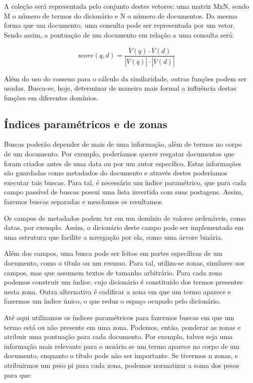 A coleção será representada pelo conjunto destes vetores: uma matriz MxN, sendo M o número de termos do dicionário e N o número de documentos. Da mesma forma que um documento, uma consulta pode ser representada por um vetor. Sendo assim, a pontuação de um documento em relação a uma consulta será:

$$score(q,d) = \frac{\overline{V}(q) \cdot \overline{V}(d)}{|\overline{V}(q)|\cdot|\overline{V}(d)|}$$

Além do uso do cosseno para o cálculo da similaridade, outras funções podem ser usadas. Busca-se, hoje, determinar de maneira mais formal a influência destas funções em diferentes domínios.

\subsection{Índices paramétricos e de zonas}

Buscas poderão depender de mais de uma informação, além de termos no corpo de um documento. Por exemplo, poderíamos querer resgatar documentos que foram criados antes de uma data ou por um autor específico. Estas informações são guardadas como metadados do documento e através destes poderíamos executar tais buscas. Para tal, é necessário um índice paramétrico, que para cada campo passível de buscas possui uma lista invertida com suas postagens. Assim, fazemos buscas separadas e mesclamos os resultamos.

Os campos de metadados podem ter em um domínio de valores ordenáveis, como datas, por exemplo. Assim, o dicionário deste campo pode ser implementado em uma estrutura que facilite a navegação por ela, como uma árvore binária.

Além dos campos, uma busca pode ser feitos em partes específicas de um documento, como o título ou um resumo. Para tal, utiliza-se zonas, similares aos campos, mas que assumem textos de tamanho arbitrário. Para cada zona podemos construir um índice, cujo dicionário é constituído dos termos presentes nesta zona. Outra alternativa é codificar a zona em que um termo aparece e fazermos um índice único, o que reduz o espaço ocupado pelo dicionário.

Até aqui utilizamos os índices paramétricos para fazermos buscas em que um termo está ou não presente em uma zona. Podemos, então, ponderar as zonas e atribuir uma pontuação para cada documento. Por exemplo, talvez seja uma informação mais relevante para o usuário se um termo aparece no corpo de um documento, enquanto o título pode não ser importante. Se tivermos n zonas, e atribuirmos um peso pi para cada zona, podemos normatizar a soma dos pesos para que:


